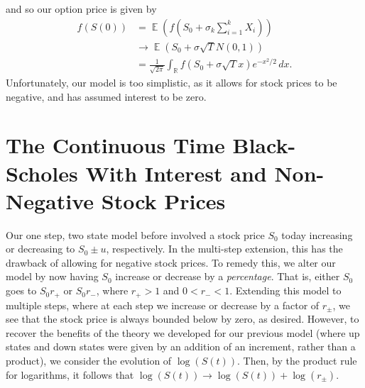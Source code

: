 \documentclass[12pt]{article}
\newcommand{\rr}{\mathbb{R}}
\DeclareMathOperator{\ex}{\mathbb{E}}
\theoremstyle{plain}
\theoremstyle{definition}
\theoremstyle{remark}
\numberwithin{equation}{section}  %
\begin{document}
and so our option price is given by
\begin{equation*}
	\begin{split}
		f(S(0)) & = \ex(f(S_{0} + \sigma_{k} \sum_{i=1}^{k} X_{i}))
		\\
		& \to \ex(S_{0} + \sigma \sqrt{T}N(0,1))
		\\
		& = \frac{1}{\sqrt{2 \pi}} \int_{\rr} f(S_{0} + \sigma \sqrt{T}x)
		e^{-x^{2}/2}
		\, dx. 
	\end{split}
\end{equation*}
Unfortunately, our model is too simplistic, as it allows for stock prices to
be negative, and has assumed interest to be zero. 
\section{The Continuous Time Black-Scholes With Interest and Non-Negative
Stock Prices}
Our one step, two state model before involved a stock price $S_{0}$ today
increasing or decreasing to $S_{0} \pm u$, respectively. In the multi-step
extension, this has the drawback of allowing for negative stock prices. 
To remedy this, we alter our model by now having $S_{0}$ increase or decrease by a \emph{percentage}.
That is, either $S_{0}$  goes to $S_{0}r_{+}$  or $S_{0}r_{-}$, where
$r_{+} > 1$  and $0 < r_{-} < 1$. Extending this model to multiple
steps, where at each step we increase or decrease by a factor of $r_{\pm}$,
we see that the stock price is always bounded below by zero, as desired.
However, to recover the benefits of the theory we developed for our previous
model (where up states and down states were given by an addition of an
increment, rather than a product), we
consider the evolution of  $\log(S(t))$. Then, by the product rule for logarithms,
it follows that $\log(S(t)) \to \log(S(t)) + \log(r_{\pm})$.
\end{document}
